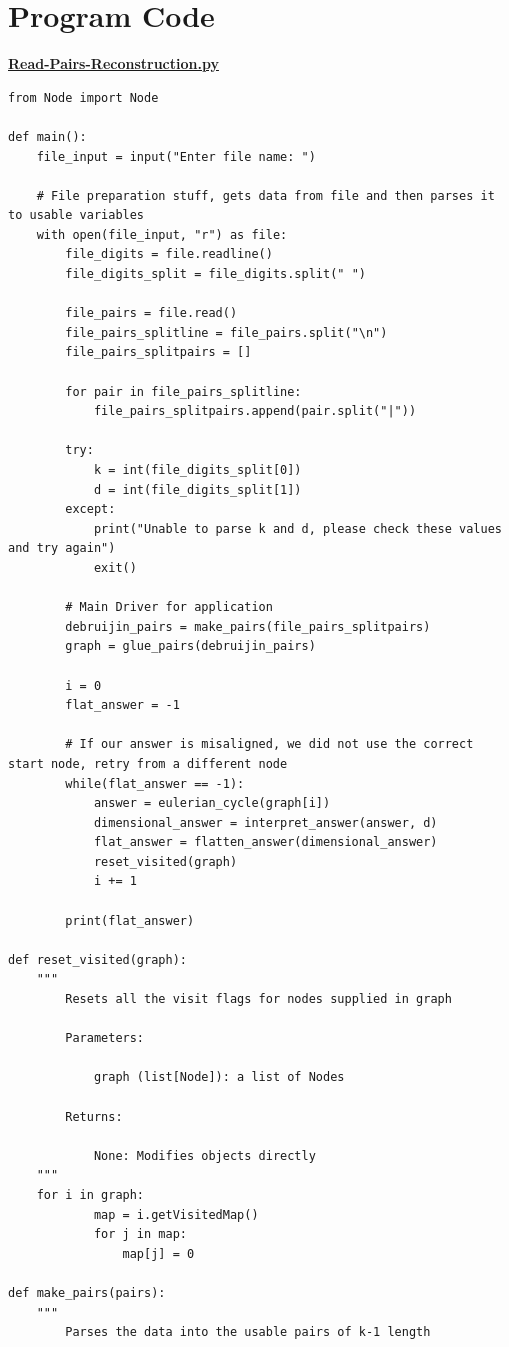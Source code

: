 \documentclass{article}
\begin{document}
\section*{Program Code}
\textbf{\underline{Read-Pairs-Reconstruction.py}}
\begin{lstlisting}
from Node import Node

def main():
    file_input = input("Enter file name: ")

    # File preparation stuff, gets data from file and then parses it to usable variables
    with open(file_input, "r") as file:
        file_digits = file.readline()
        file_digits_split = file_digits.split(" ")

        file_pairs = file.read()
        file_pairs_splitline = file_pairs.split("\n")
        file_pairs_splitpairs = []

        for pair in file_pairs_splitline:
            file_pairs_splitpairs.append(pair.split("|"))
       
        try:
            k = int(file_digits_split[0])
            d = int(file_digits_split[1])
        except:
            print("Unable to parse k and d, please check these values and try again")
            exit()

        # Main Driver for application
        debruijin_pairs = make_pairs(file_pairs_splitpairs)
        graph = glue_pairs(debruijin_pairs)

        i = 0
        flat_answer = -1

        # If our answer is misaligned, we did not use the correct start node, retry from a different node
        while(flat_answer == -1):
            answer = eulerian_cycle(graph[i])
            dimensional_answer = interpret_answer(answer, d)
            flat_answer = flatten_answer(dimensional_answer)
            reset_visited(graph)
            i += 1

        print(flat_answer)

def reset_visited(graph):
    """
        Resets all the visit flags for nodes supplied in graph 

        Parameters:

            graph (list[Node]): a list of Nodes

        Returns:

            None: Modifies objects directly
    """
    for i in graph:
            map = i.getVisitedMap()
            for j in map:
                map[j] = 0

def make_pairs(pairs):
    """
        Parses the data into the usable pairs of k-1 length


\end{lstlisting}
\end{document}
